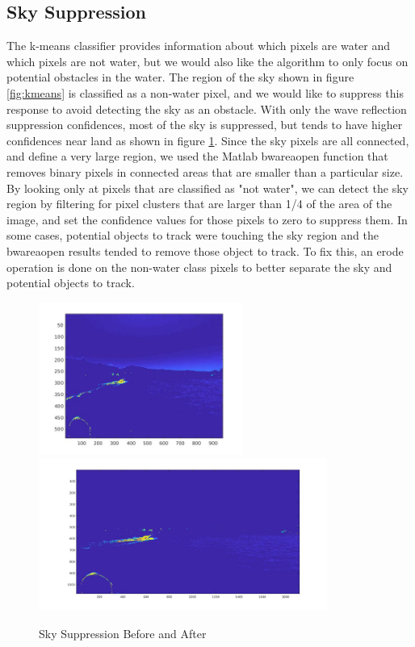 \documentclass{article}
\begin{document}
\subsection{Sky Suppression}
The k-means classifier provides information about which pixels are water and
which pixels are not water, but we would also like the algorithm to only focus
on potential obstacles in the water.  The region of the sky shown in figure
\ref{fig:kmeans} is classified as a non-water pixel, and we would like to
suppress this response to avoid detecting the sky as an obstacle. With only the
wave reflection suppression confidences, most of the sky is suppressed, but
tends to have higher confidences near land as shown in figure
\ref{fig:skysuppress}.  Since the sky pixels are all connected, and define a
very large region, we used the Matlab bwareaopen function that removes binary
pixels in connected areas that are smaller than a particular size.  By looking
only at pixels that are classified as "not water", we can detect the sky region
by filtering for pixel clusters that are larger than 1/4 of the area of the
image, and set the confidence values for those pixels to zero to suppress them.
In some cases, potential objects to track were touching the sky region and the
bwareaopen results tended to remove those object to track.  To fix this, an
erode operation is done on the non-water class pixels to better separate the sky
and potential objects to track.

\begin{figure}
\label{fig:skysuppress}
\includegraphics[height=5cm]{hsv_confidence}
\includegraphics[height=5cm]{hsv_kmeans2_suppressed}
\centering
\caption{Sky Suppression Before and After}
\end{figure}
\end{document}
